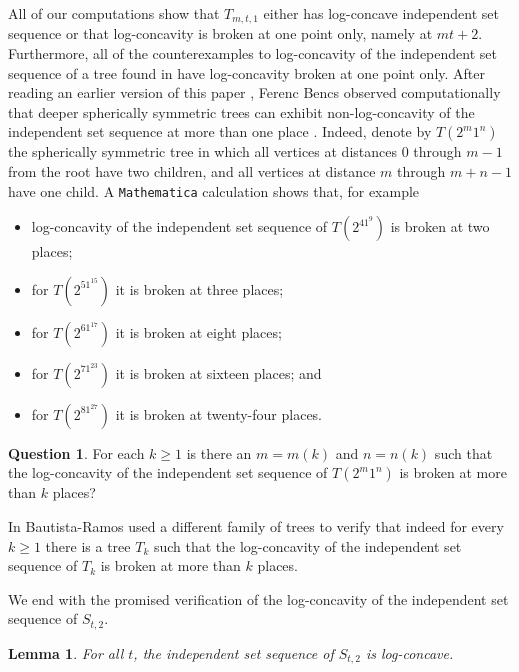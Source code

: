 \documentclass[12pt]{article}
\newtheorem{lemma}[thm]{Lemma}
\theoremstyle{definition}
\theoremstyle{definition}
\theoremstyle{definition}
\newtheorem{question}[thm]{Question}
\theoremstyle{definition}
\theoremstyle{definition}
\theoremstyle{definition}
\theoremstyle{definition}
\theoremstyle{definition}
\theoremstyle{remark}
\begin{document}
All of our computations show that $T_{m,t,1}$ either has log-concave independent set sequence or that log-concavity is broken at one point only, namely at $mt+2$. Furthermore, all of the counterexamples to log-concavity of the independent set sequence of a tree found in \cite{KL2023, KLYM2023, RS2025} have log-concavity broken at one point only. After reading an earlier version of this paper \cite{G2025}, Ferenc Bencs observed computationally that deeper spherically symmetric trees can exhibit non-log-concavity of the independent set sequence at more than one place \cite{B}. Indeed, denote by $T(2^m1^n)$ the spherically symmetric tree in which all vertices at distances $0$ through $m-1$ from the root have two children, and all vertices at distance $m$ through $m+n-1$ have one child. A {\tt Mathematica} calculation shows that, for example
\begin{itemize}
\item log-concavity of the independent set sequence of $T(2^41^9)$ is broken at two places;
\item for $T(2^51^{15})$ it is broken at three places;
\item for $T(2^61^{17})$ it is broken at eight places;
\item for $T(2^71^{23})$ it is broken at sixteen places; and
\item for $T(2^81^{27})$ it is broken at twenty-four places.
\end{itemize}

\begin{question}
For each $k \geq 1$ is there an $m=m(k)$ and $n=n(k)$ such that the log-concavity of the independent set sequence of $T(2^m1^n)$ is broken at more than $k$ places?
\end{question}

In \cite{BR2025} Bautista-Ramos used a different family of trees to verify that indeed for every $k \geq 1$ there is a tree $T_k$ such that the log-concavity of the independent set sequence of $T_k$ is broken at more than $k$ places.   

\medskip

We end with the promised verification of the log-concavity of the independent set sequence of $S_{t,2}$.

\begin{lemma} \label{lemma-mod-lc}
For all $t$, the independent set sequence of $S_{t,2}$ is log-concave.
\end{lemma}
\end{document}
